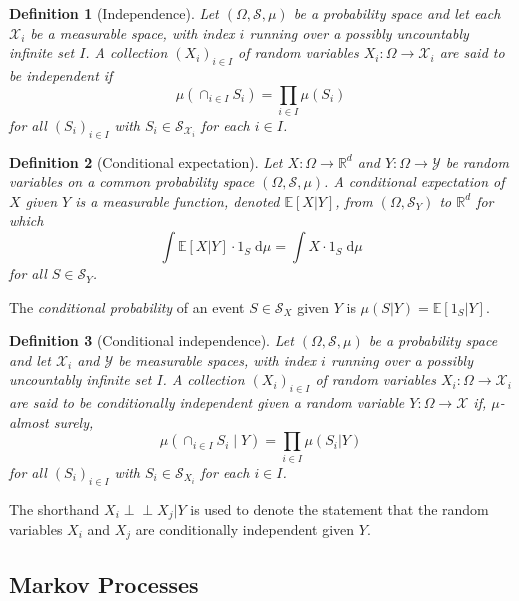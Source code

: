 \documentclass[12pt,paper=letter]{scrreprt}
\newtheorem{definition}{Definition}[chapter]
\newcommand\ci{\perp\!\!\!\perp}
\begin{document}
\begin{definition}[Independence]
Let $(\Omega,\mathcal{S},\mu)$ be a probability space and let each $\mathcal{X}_i$ be a measurable space, with index $i$ running over a possibly uncountably infinite set $I$.
A collection $(X_i)_{i \in I}$ of random variables $X_i : \Omega \rightarrow \mathcal{X}_i$ are said to be \emph{independent} if
$$
\mu\left( \cap_{i \in I} S_i \right) = \prod_{i \in I} \mu(S_i)
$$
for all $(S_i)_{i \in I}$ with $S_i \in \mathcal{S}_{\mathcal{X}_i}$ for each $i \in I$.
\end{definition}

\begin{definition}[Conditional expectation]
Let $X : \Omega \rightarrow \mathbb{R}^d$ and $Y : \Omega \rightarrow \mathcal{Y}$ be random variables on a common probability space $(\Omega,\mathcal{S},\mu)$.
A \emph{conditional expectation} of $X$ given $Y$ is a measurable function, denoted $\mathbb{E}[X|Y]$, from $(\Omega,\mathcal{S}_Y)$ to $\mathbb{R}^d$ for which 
$$
\int \mathbb{E}[X|Y] \cdot 1_S \; \mathrm{d}\mu = \int X \cdot 1_S \; \mathrm{d}\mu
$$
for all $S \in \mathcal{S}_Y$.
\end{definition}

\noindent The \emph{conditional probability} of an event $S \in \mathcal{S}_{X}$ given $Y$ is $\mu(S | Y) = \mathbb{E}[\mathrm{1}_S | Y]$.

\begin{definition}[Conditional independence]
Let $(\Omega,\mathcal{S},\mu)$ be a probability space and let $\mathcal{X}_i$ and $\mathcal{Y}$ be measurable spaces, with index $i$ running over a possibly uncountably infinite set $I$.
A collection $(X_i)_{i \in I}$ of random variables $X_i : \Omega \rightarrow \mathcal{X}_i$ are said to be \emph{conditionally independent} given a random variable $Y : \Omega \rightarrow \mathcal{X}$ if, $\mu$-almost surely,
$$
\mu\left( \cap_{i \in I} S_i \mid Y \right) = \prod_{i \in I} \mu(S_i | Y)
$$
for all $(S_i)_{i \in I}$ with $S_i \in \mathcal{S}_{X_i}$ for each $i \in I$.
\end{definition}

\noindent The shorthand $X_i \ci  X_j | Y$ is used to denote the statement that the random variables $X_i$ and $X_j$ are conditionally independent given $Y$.

\subsection{Markov Processes}
\label{subsec: Markov processes}
\end{document}
